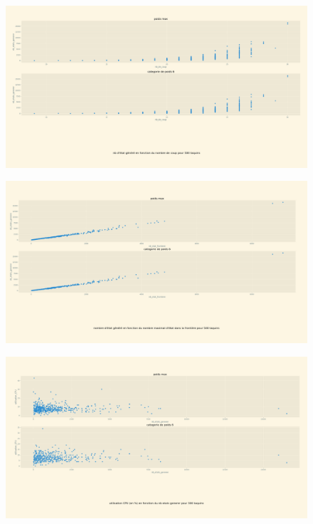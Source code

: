 \documentclass[a4paper, 12pt]{article}
\begin{document}
\begin{figure}[H]
    \centering
    \includegraphics[width=\textwidth]{Taquin 3x3 nombre d'etats generer en fct du nb de coups}
\end{figure}

\begin{figure}[H]
    \centering
    \includegraphics[width=\textwidth]{Taquin 3x3 nombre d'etats generer en fct du nb max detat dans la frontiere}
\end{figure}

\begin{figure}[H]
    \centering
    \includegraphics[width=\textwidth]{Taquin 3x3 utilisation CPU en fct du nb d'etat generer}
\end{figure}
\end{document}
